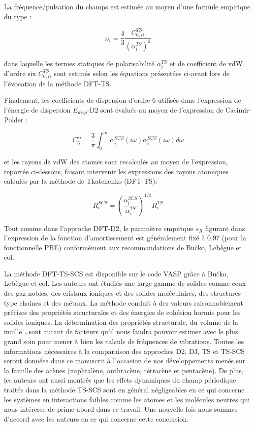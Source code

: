 La fréquence/pulsation du champs est estimée au moyen d’une formule empirique du type : 

\begin{equation}
\omega_{i} = \frac{4}{3} \frac{C_{6,ii}^{TS}}{(\alpha_{i}^{TS})^{2}}
\end{equation}

dans laquelle les termes statiques de polarisabilité $\alpha_{i}^{TS}$ et de coefficient de vdW d’ordre six $C_{6,ii}^{TS}$ sont estimés selon les équations présentées ci-avant lors de l’évocation de la méthode DFT-TS.

Finalement, les coefficients de dispersion d’ordre 6 utilisés dans l’expression de l’énergie de dispersion $E_{disp}$-D2 sont évalués au moyen de l’expression de Casimir- Polder :

\begin{equation}
C_{6}^{ij} = \frac{3}{\pi} \int_{0}^{\infty} \alpha_{i}^{SCS} (i\omega) \alpha_{i}^{SCS} (i\omega) d\omega
\end{equation}

et les rayons de vdW des atomes sont recalculés au moyen de l’expression, reportée ci-dessous, faisant intervenir les expressions des rayons atomiques calculés par la méthode de Tkatchenko (DFT-TS): 

\begin{equation}
R_{i}^{SCS} = \left(\frac{\alpha_{i}^{SCS}}{\alpha_{i}^{TS}}\right)^{1/3} R_{i}^{TS}
\end{equation}

Tout comme dans l’approche DFT-D2, le paramètre empirique $s_{R}$ figurant dans l’expression de la fonction d’amortissement est généralement fixé à 0.97 (pour la fonctionnelle PBE) conformément aux recommandations de Bu\u{c}ko, Lebègue et col\cite{buvcko2013tkatchenko}.

La méthode DFT-TS-SCS est disponible sur le code VASP grâce à Bu\u{c}ko, Lebègue et col\cite{buvcko2013tkatchenko}. Les auteurs ont étudiés une large gamme de solides comme ceux des gaz nobles, des cristaux ioniques et des solides moléculaires, des structures type chaines et des métaux. La méthode conduit à des valeurs raisonnablement précises des propriétés structurales et des énergies de cohésion hormis pour les solides ioniques. La détermination des propriétés structurale, du volume de la maille \dots sont autant de facteurs qu’il nous faudra pouvoir estimer avec le plus grand soin pour mener à bien les calculs de fréquences de vibrations. Toutes les informations nécessaires à la comparaison des approches D2, D3, TS et TS-SCS seront données dans ce manuscrit à l’occasion de nos développements menés sur la famille des acènes (naphtalène, anthracène, tétracène et pentacène). De plus, les auteurs ont aussi montrés que les effets dynamiques du champ périodique traités dans la méthode TS-SCS sont en général négligeables en ce qui concerne les systèmes en interactions faibles comme les atomes et les molécules neutres qui nous intéresse de prime abord dans ce travail. Une nouvelle fois nous sommes d’accord avec les auteurs en ce qui concerne cette conclusion.

